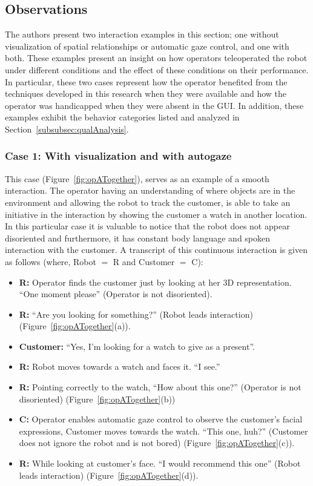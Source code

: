 \documentclass[journal]{IEEEtran}
\begin{document}

\subsection{Observations}
The authors present two interaction examples in this section; one without visualization of spatial relationships or automatic gaze control, and one with both.
These examples present an insight on how operators teleoperated the robot under different conditions and the effect of these conditions on their performance.
In particular, these two cases represent how the operator benefited from the techniques developed in this research when they were available and how the operator was handicapped when they were absent in the GUI. 
In addition, these examples exhibit the behavior categories listed and analyzed in Section~\ref{subsubsec:qualAnalysis}. 

\subsubsection{Case 1: With visualization and with autogaze}
This case (Figure~\ref{fig:opATogether}), serves as an example of a smooth interaction. 
The operator having an understanding of where objects are in the environment and allowing the robot to track the customer, is able to take an initiative in the interaction by showing the customer a watch in another location. 
In this particular case it is valuable to notice that the robot does not appear disoriented and furthermore, it has constant body language and spoken interaction with the customer. 
A transcript of this continuous interaction is given as follows (where, Robot $=$ R and Customer $=$ C):
\begin{itemize}
  \item[] {\bf R:} Operator finds the customer just by looking at her 3D representation. ``One moment please'' (Operator is not disoriented).
  \item[] {\bf R:} ``Are you looking for something?'' (Robot leads interaction) (Figure~\ref{fig:opATogether}(a)).
  \item[] {\bf Customer:} ``Yes, I'm looking for a watch to give as a present''.
  \item[]	{\bf R:} Robot moves towards a watch and faces it. ``I see.''
 \item[] {\bf R:} Pointing correctly to the watch, ``How about this one?'' (Operator is not disoriented) (Figure~\ref{fig:opATogether}(b))
 \item[] {\bf C:} Operator enables automatic gaze control to observe the customer's facial expressions, Customer moves towards the watch. ``This one, huh?'' (Customer does not ignore the robot and is not bored) (Figure~\ref{fig:opATogether}(c)).
 \item[] {\bf R:} While looking at customer's face. ``I would recommend this one'' (Robot leads interaction) (Figure~\ref{fig:opATogether}(d)).
\end{itemize}
\end{document}
